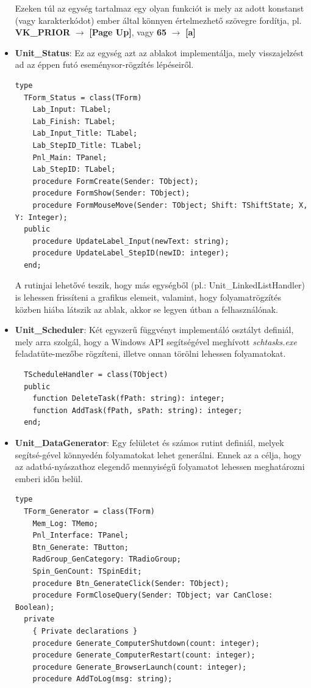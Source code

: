 \begin{itemize}
{Ezeken túl az egység tartalmaz egy olyan funkciót is mely az adott konstanst (vagy karakterkódot) ember által könnyen értelmezhető szövegre fordítja, pl. \textbf{VK\_PRIOR} $\rightarrow$ \textbf{[Page Up]}, vagy \textbf{65} $\rightarrow$ \textbf{[a]}

	}
	\item{
		\textbf{Unit\_Status}: Ez az egység azt az ablakot implementálja, mely visszajelzést ad az éppen futó eseménysor-rögzítés lépéseiről.
		\begin{lstlisting}
type
  TForm_Status = class(TForm)
    Lab_Input: TLabel;
    Lab_Finish: TLabel;
    Lab_Input_Title: TLabel;
    Lab_StepID_Title: TLabel;
    Pnl_Main: TPanel;
    Lab_StepID: TLabel;
    procedure FormCreate(Sender: TObject);
    procedure FormShow(Sender: TObject);
    procedure FormMouseMove(Sender: TObject; Shift: TShiftState; X, Y: Integer);
  public
    procedure UpdateLabel_Input(newText: string);
    procedure UpdateLabel_StepID(newID: integer);
  end;
		\end{lstlisting}

A rutinjai lehetővé teszik, hogy más egységből (pl.: Unit\_LinkedListHandler) is lehessen frissíteni a grafikus elemeit, valamint, hogy folyamatrögzítés közben hiába látszik az ablak, akkor se legyen útban a felhasználónak.
	}
	\item{
		\textbf{Unit\_Scheduler}: Két egyszerű függvényt implementáló osztályt definiál, mely arra szolgál, hogy a Windows API segítségével meghívott \textit{schtasks.exe} feladatüte\hyp{}mezőbe rögzíteni, illetve onnan törölni lehessen folyamatokat.
	\begin{lstlisting}
  TScheduleHandler = class(TObject)
  public
    function DeleteTask(fPath: string): integer;
    function AddTask(fPath, sPath: string): integer;
  end;
	\end{lstlisting}
	}
	\item{
		\textbf{Unit\_DataGenerator}: Egy felületet és számos rutint definiál, melyek segítsé\hyp{}gével könnyedén folyamatokat lehet generálni. Ennek az a célja, hogy az adatbá\hyp{}nyászathoz elegendő mennyiségű folyamatot lehessen meghatározni emberi időn belül.

	\begin{lstlisting}
type
  TForm_Generator = class(TForm)
    Mem_Log: TMemo;
    Pnl_Interface: TPanel;
    Btn_Generate: TButton;
    RadGroup_GenCategory: TRadioGroup;
    Spin_GenCount: TSpinEdit;
    procedure Btn_GenerateClick(Sender: TObject);
    procedure FormCloseQuery(Sender: TObject; var CanClose: Boolean);
  private
    { Private declarations }
    procedure Generate_ComputerShutdown(count: integer);
    procedure Generate_ComputerRestart(count: integer);
    procedure Generate_BrowserLaunch(count: integer);
    procedure AddToLog(msg: string);


\end{lstlisting}}
\end{itemize}
